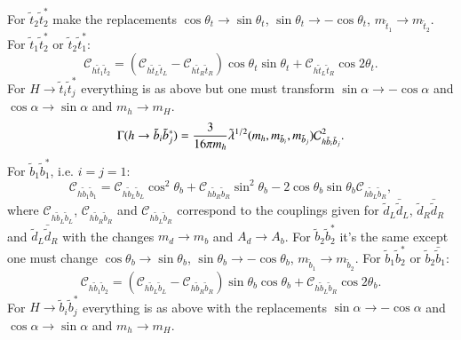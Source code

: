 \documentclass[final,3p,times]{elsarticle}
\begin{document}
For $\tilde{t}_2 {\tilde{t}}_2^*$ make the replacements $\cos\theta_t \rightarrow \sin\theta_t$, $\sin\theta_t \rightarrow -\cos\theta_t$, $m_{\tilde{t}_1} \rightarrow m_{\tilde{t}_2}$.
For $\tilde{t}_1 {\tilde{t}}_2^*$ or $\tilde{t}_2 {\tilde{t}}_1^*$:
\begin{equation}
\mathcal{C}_{h \tilde{t}_{1} \tilde{t}_{2}} = (\mathcal{C}_{h \tilde{t}_{L} \tilde{t}_{L}} - \mathcal{C}_{h \tilde{t}_{R} \tilde{t}_{R}})\cos\theta_t \sin\theta_t + \mathcal{C}_{h \tilde{t}_{L} \tilde{t}_{R}} \cos 2\theta_t.
\end{equation}
For $H \rightarrow \tilde{t}_i {\tilde{t}}_j^*$ everything is as above but one must transform $\sin\alpha \rightarrow -\cos\alpha$ and $\cos\alpha \rightarrow \sin\alpha$ and $m_h \rightarrow m_H$.
\begin{equation}\label{hsbsb}
\Gamma(h \rightarrow \tilde{b}_i {\tilde{b}}_j^*) = {3 \over 16 \pi m_h} \tilde{\lambda}^{1/2}(m_h, m_{\tilde{b}_i}, m_{\tilde{b}_j}) \mathcal{C}_{h \tilde{b}_{i} \tilde{b}_{j}}^2.
\end{equation} 
For $\tilde{b}_1 {\tilde{b}}_1^*$, i.e. $i=j=1$:
\begin{equation}
\mathcal{C}_{h \tilde{b}_{1} \tilde{b}_{1}} = \mathcal{C}_{h \tilde{b}_{L} \tilde{b}_{L}} \cos^2 \theta_b + \mathcal{C}_{h \tilde{b}_{R} \tilde{b}_{R}} \sin^2 \theta_b - 2 \cos\theta_b \sin\theta_b \mathcal{C}_{h \tilde{b}_{L} \tilde{b}_{R}},
\end{equation}
where $\mathcal{C}_{h \tilde{b}_{L} \tilde{b}_{L}}$, $\mathcal{C}_{h \tilde{b}_{R} \tilde{b}_{R}}$ and $\mathcal{C}_{h \tilde{b}_{L} \tilde{b}_{R}}$ correspond to the couplings given for $\tilde{d}_L \bar{\tilde{d}}_L$, $\tilde{d}_R \bar{\tilde{d}}_R$ and $\tilde{d}_L \bar{\tilde{d}}_R$ with the changes $m_d \rightarrow m_b$ and $A_d \rightarrow A_b$.
For $\tilde{b}_2 {\tilde{b}}_2^*$ it's the same except one must change $\cos\theta_b \rightarrow \sin\theta_b$, $\sin\theta_b \rightarrow -\cos\theta_b$, $m_{\tilde{b}_1} \rightarrow m_{\tilde{b}_2}$.
For $\tilde{b}_1 {\tilde{b}}_2^*$ or $\tilde{b}_2 \bar{\tilde{b}}_1$:
\begin{equation}
\mathcal{C}_{h \tilde{b}_{1} \tilde{b}_{2}} = (\mathcal{C}_{h \tilde{b}_{L} \tilde{b}_{L}} - \mathcal{C}_{h \tilde{b}_{R} \tilde{b}_{R}})\sin\theta_b \cos\theta_b + \mathcal{C}_{h \tilde{b}_{L} \tilde{b}_{R}} \cos 2\theta_b.
\end{equation}
For $H \rightarrow \tilde{b}_i {\tilde{b}}_j^*$ everything is as above with the replacements $\sin\alpha \rightarrow -\cos\alpha$ and $\cos\alpha \rightarrow \sin\alpha$ and $m_h \rightarrow m_H$.
\end{document}
